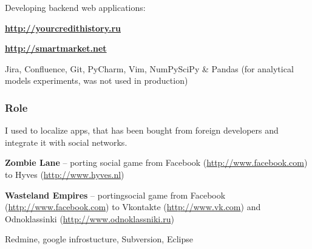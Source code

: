 \documentclass{cv}
\begin{document}
    \gaa
      Developing backend web applications:
      \begin{bulist}
        \item \textbf{\url{http://yourcredithistory.ru}}
        \item \textbf{\url{http://smartmarket.net}}
      \end{bulist}
    \devtools
      Jira, Confluence, Git, PyCharm, Vim, NumPy\/SciPy \& Pandas (for
      analytical models experiments, was not used in production)

    \subsubsection* {Role}
      I used to localize apps, that has been bought from foreign developers and
      integrate it with social networks.
    \begin{gaas}
      \item \textbf{Zombie Lane} -- porting social game from Facebook
        (\url{http://www.facebook.com}) to Hyves (\url{http://www.hyves.nl})
      \item \textbf{Wasteland Empires} -- portingsocial game from Facebook
        (\url{http://www.facebook.com}) to Vkontakte
        (\url{http://www.vk.com}) and Odnoklassinki
        (\url{http://www.odnoklassniki.ru})
    \end{gaas}
    \devtools
      Redmine, google infrostucture, Subversion, Eclipse

\end{document}
